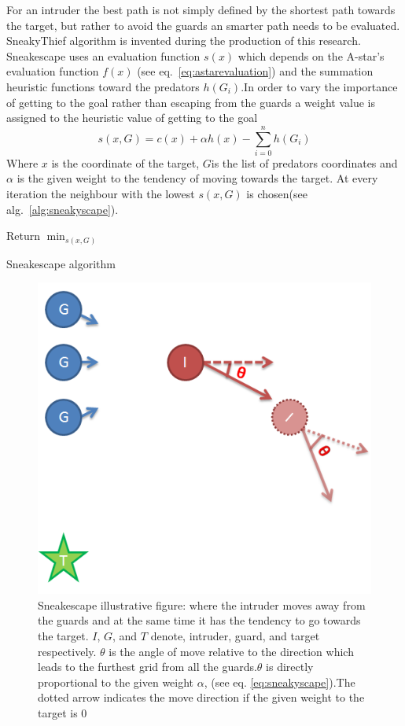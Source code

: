 For an intruder the best path is not simply defined by the shortest path towards the target, but rather to avoid the guards an smarter path needs to be evaluated. SneakyThief algorithm is invented during the production of this research.
			Sneakescape uses an evaluation function $s(x)$ which depends on the A-star's evaluation function $f(x)$ (see eq.~\ref{eq:astarevaluation}) and the summation heuristic functions toward the predators $h(G_i)$.In order to vary the importance of getting to the goal rather than escaping from the guards a weight value is assigned to the heuristic value of getting to the goal
			\begin{equation}
				\label{eq:sneakyscape}
			 	s(x,G) = c(x) + \alpha h(x) - \sum_{i=0}^n h(G_i)
			\end{equation} 
			Where $x$ is the coordinate of the target, $G$is the list of predators coordinates and $\alpha$ is the given weight to the tendency of moving towards the target. At every iteration the neighbour with the lowest $s(x,G)$ is chosen(see alg.~\ref{alg:sneakyscape}).
	\begin{algorithm}
	 \label{alg:sneakyscape}
				Return $\min_{s(x,G)}$ \;
				\caption{Sneakescape algorithm}
			\end{algorithm}
			
	\begin{figure}
	    \includegraphics[width=\columnwidth]{SneakyStuff.PNG}
	    \caption{Sneakescape illustrative figure: where the intruder moves away from the guards and at the same time it has the tendency to go towards the target. $I$, $G$, and $T$ denote, intruder, guard, and target respectively. $\theta$ is the angle of move relative to the direction which leads to the furthest grid from all the guards.$\theta$ is directly proportional to the given weight $\alpha$, (see eq. \ref{eq:sneakyscape}).The dotted arrow indicates the move direction if the given weight to the target is $0$}
	\end{figure}
